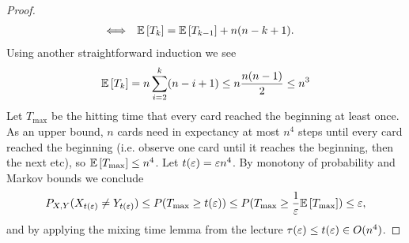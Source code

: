 \begin{aufgabe}
\begin{proof}
\begin{align*}
        \Longleftrightarrow \quad &  \mathbb{E}\left[T_k\right] =  \mathbb{E}\left[T_{k-1}\right] + n(n-k+1).
    \end{align*}
    Using another straightforward induction we see
    \begin{align*}
        \mathbb{E}\left[T_k\right] = n\sum_{i=2}^{k}(n-i+1) \leq n\frac{n(n-1)}{2} \leq n^3
    \end{align*}
    Let $T_{\max}$ be the hitting time that every card reached the beginning at least once.
    As an upper bound, $n$ cards need in expectancy at most $n^4$ steps until every card reached the beginning (i.e. observe one card until it reaches the beginning, then the next etc), so $\mathbb{E}\left[T_{\max}\right] \leq n^4$.
    Let $t(\varepsilon) = \varepsilon n^4$.
    By monotony of probability and Markov bounds we conclude
    \begin{align*}
        P_{X,Y}(X_{t(\varepsilon)} \neq Y_{t(\varepsilon)}) \leq P(T_{\max} \geq t(\varepsilon)) \leq P(T_{\max} \geq \frac{1}{\varepsilon} \mathbb{E}\left[T_{\max}\right]) \leq \varepsilon,
    \end{align*}
    and by applying the mixing time lemma from the lecture $\tau(\varepsilon) \leq t(\varepsilon) \in O(n^4)$.
\end{proof}
\end{aufgabe}